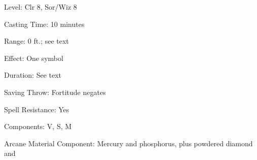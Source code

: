 
\begin{description*}
\item[Level:] Clr 8, Sor/Wiz 8
\item[Casting Time:] 10 minutes
\item[Range:] 0 ft.; see text
\item[Effect:] One symbol
\item[Duration:] See text
\item[Saving Throw:] Fortitude negates
\item[Spell Resistance:] Yes
\item[Components:] V, S, M
\item[Arcane Material Component:] Mercury and phosphorus, plus powdered diamond and
\end{description*}

